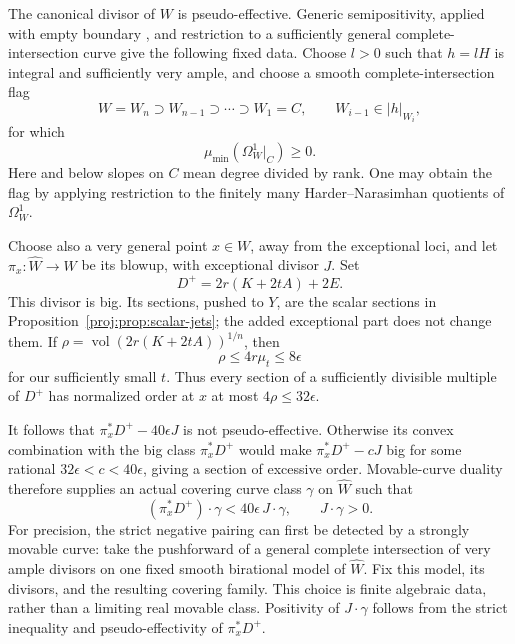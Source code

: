 \documentclass[11pt,letterpaper]{article}
\DeclareMathOperator{\vol}{vol}
\theoremstyle{definition}
\theoremstyle{remark}
\begin{document}
The canonical divisor of \(W\) is pseudo-effective. Generic
semipositivity, applied with empty boundary
\cite[Theorem~2.1]{Proj-CampanaPaun2015}, and restriction to a sufficiently
general complete-intersection curve give the following fixed data.
Choose \(l>0\) such that \(h=lH\) is integral and sufficiently very
ample, and choose a smooth complete-intersection flag
\[
 W=W_n\supset W_{n-1}\supset\cdots\supset W_1=C,
 \qquad W_{i-1}\in |h|_{W_i},
\]
for which
\begin{equation}
\label{proj:fr:generic-nef}
 \mu_{\min}(\Omega_W^1|_C)\geq0.
\end{equation}
Here and below slopes on \(C\) mean degree divided by rank. One may
obtain the flag by applying restriction to the finitely many
Harder--Narasimhan quotients of \(\Omega_W^1\).

Choose also a very general point \(x\in W\), away from the exceptional
loci, and let \(\pi_x:\widehat W\to W\) be its blowup, with exceptional
divisor \(J\). Set
\[
 D^+=2r(K+2tA)+2E.
\]
This divisor is big. Its sections, pushed to \(Y\), are the scalar
sections in Proposition~\ref{proj:prop:scalar-jets}; the added exceptional
part does not change them. If
\(\rho=\vol(2r(K+2tA))^{1/n}\), then
\[
 \rho\leq4r\mu_t\leq8\epsilon
\]
for our sufficiently small \(t\). Thus every section of a sufficiently
divisible multiple of \(D^+\) has normalized order at \(x\) at most
\(4\rho\leq32\epsilon\).

It follows that \(\pi_x^*D^+-40\epsilon J\) is not pseudo-effective.
Otherwise its convex combination with the big class \(\pi_x^*D^+\)
would make \(\pi_x^*D^+-cJ\) big for some rational
\(32\epsilon<c<40\epsilon\), giving a section of excessive order.
Movable-curve duality \cite[Theorem~2.2]{BDPP} therefore supplies an
actual covering curve class \(\gamma\) on \(\widehat W\) such that
\begin{equation}
\label{proj:fr:curve-test}
 (\pi_x^*D^+)\cdot\gamma
       <40\epsilon\,J\cdot\gamma,\qquad J\cdot\gamma>0.
\end{equation}
For precision, the strict negative pairing can first be detected by a
strongly movable curve: take the pushforward of a general complete
intersection of very ample divisors on one fixed smooth birational
model of \(\widehat W\). Fix this model, its divisors, and the resulting
covering family. This choice is finite algebraic data, rather than a
limiting real movable class. Positivity of \(J\cdot\gamma\) follows
from the strict inequality and pseudo-effectivity of \(\pi_x^*D^+\).
\end{document}
